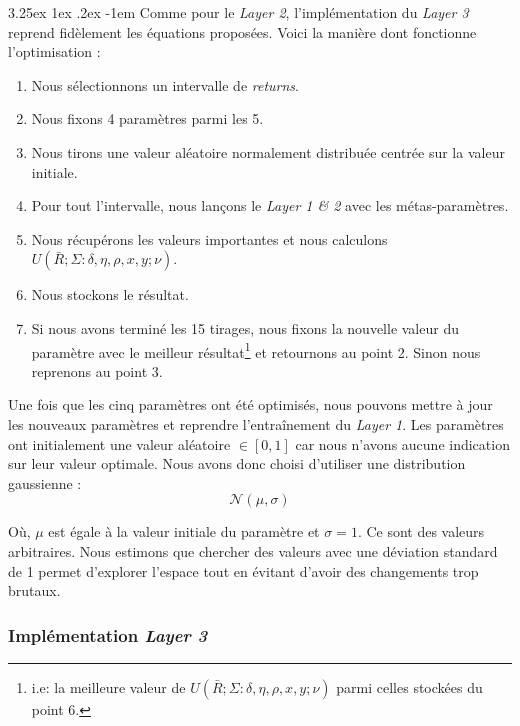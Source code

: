 \documentclass[a4paper, 11pt]{article}
\makeatletter
\renewcommand\paragraph{\@startsection{paragraph}{5}{\z@}%
  {3.25ex \@plus1ex \@minus.2ex}%
  {-1em}%
  {\normalfont\normalsize\bfseries}}
\makeatother
\begin{document}
\paragraph{}
Comme pour le \textit{Layer 2}, l'implémentation du \textit{Layer 3} reprend fidèlement les équations proposées. Voici la manière dont fonctionne
l'optimisation :
\begin{enumerate}
 \item Nous sélectionnons un intervalle de \textit{returns}.
 \item Nous fixons 4 paramètres parmi les 5.
 \item Nous tirons une valeur aléatoire normalement distribuée centrée sur la valeur initiale.
 \item Pour tout l'intervalle, nous lançons le \textit{Layer 1 \& 2} avec les métas-paramètres.
 \item Nous récupérons les valeurs importantes et nous calculons $U(\bar{R};\Sigma : \delta, \eta, \rho, x, y; \nu)$.
 \item Nous stockons le résultat.
 \item Si nous avons terminé les 15 tirages, nous fixons la nouvelle valeur du paramètre avec le meilleur résultat\footnote{i.e: la meilleure valeur de 
 $U(\bar{R};\Sigma : \delta, \eta, \rho, x, y; \nu)$ parmi celles stockées du point 6.} et retournons au point 2. Sinon nous reprenons au point 3.
\end{enumerate}

Une fois que les cinq paramètres ont été optimisés, nous pouvons mettre à jour les nouveaux paramètres et reprendre l'entraînement du \textit{Layer 1}.
Les paramètres ont initialement une valeur aléatoire $\in [0,1]$ car nous n'avons aucune indication sur leur valeur optimale. Nous avons donc choisi d'utiliser une distribution gaussienne :
$$\mathcal{N}(\mu,\sigma)$$

Où, $\mu$ est égale à la valeur initiale du paramètre et $\sigma = 1$. Ce sont des valeurs arbitraires. Nous estimons que chercher des valeurs avec une déviation
standard de 1 permet d'explorer l'espace tout en évitant d'avoir des changements trop brutaux.

\subsubsection{Implémentation \textit{Layer 3}}
\end{document}
